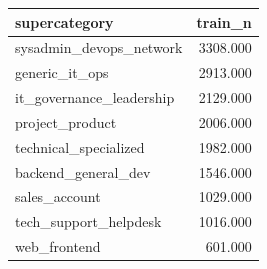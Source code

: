 \begin{tabular}{lr}
\toprule
\textbf{supercategory} & \textbf{train\_n} \\
\midrule
sysadmin\_devops\_network & 3308.000 \\
generic\_it\_ops & 2913.000 \\
it\_governance\_leadership & 2129.000 \\
project\_product & 2006.000 \\
technical\_specialized & 1982.000 \\
backend\_general\_dev & 1546.000 \\
sales\_account & 1029.000 \\
tech\_support\_helpdesk & 1016.000 \\
web\_frontend & 601.000 \\
\bottomrule
\end{tabular}
